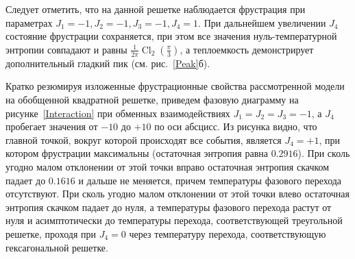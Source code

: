 \documentclass[utf8,12pt]{jetp}
\DeclareMathOperator{\Cl}{Cl}
\begin{document}
Следует отметить, что на данной решетке наблюдается фрустрация при параметрах $J_1 = -1, J_2 =-1, J_3 = -1, J_4 = 1$. При дальнейшем увеличении $J_4$ состояние фрустрации сохраняется, при этом все значения нуль-температурной энтропии совпадают и равны $\frac{1}{2\pi} \Cl_2 (\frac{\pi}{3})$, а теплоемкость демонстрирует дополнительный гладкий пик (см. рис.~\ref{Peak}б).

Кратко резюмируя изложенные фрустрационные свойства рассмотренной модели на обобщенной квадратной решетке, приведем фазовую диаграмму на рисунке~\ref{Interaction} при обменных взаимодействиях $J_1= J_2=J_3=-1$, а $J_4$ пробегает значения от $-10$ до $+10$ по оси абсцисс. Из рисунка видно, что главной точкой, вокруг которой происходят все события, является $J_4=+1$, при котором фрустрации максимальны (остаточная энтропия равна $0.2916$). При сколь угодно малом отклонении от этой точки вправо остаточная энтропия скачком падает до $0.1616$ и дальше не меняется, причем температуры фазового перехода отсутствуют. При сколь угодно малом отклонении от этой точки влево остаточная энтропия скачком падает до нуля, а температуры фазового перехода растут от нуля и асимптотически до температуры перехода, соответствующей треугольной решетке, проходя при $J_4=0$ через температуру перехода, соответствующую гексагональной решетке.
\end{document}
